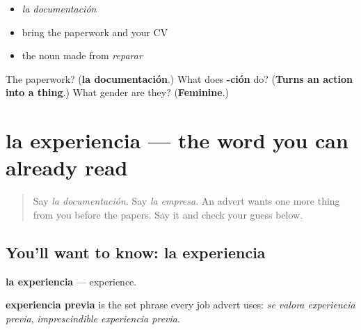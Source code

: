 \begin{itemize}
\raggedright
  \item \emph{la documentación}
  \item bring the paperwork and your CV
  \item the noun made from \emph{reparar}
\end{itemize}

\begin{tcolorbox}[breakable,colback=teal!4,colframe=teal!35!black,title={Before you move on}]
The paperwork? (\textbf{la documentación}.) What does \textbf{-ción} do? (\textbf{Turns an action into a thing}.) What gender are they? (\textbf{Feminine}.)
\end{tcolorbox}
\section[la experiencia]{la experiencia — the word you can already read}

\label{lesson:ES-C435-experiencia}



\begin{quote}
Say \emph{la documentación}. Say \emph{la empresa}. An advert wants one more thing from you before the papers. Say it and check your guess below.
\end{quote}

\subsection*{You'll want to know: la experiencia}
\textbf{la experiencia} — experience.

\textbf{experiencia previa} is the set phrase every job advert uses: \emph{se valora experiencia previa}, \emph{imprescindible experiencia previa}.

